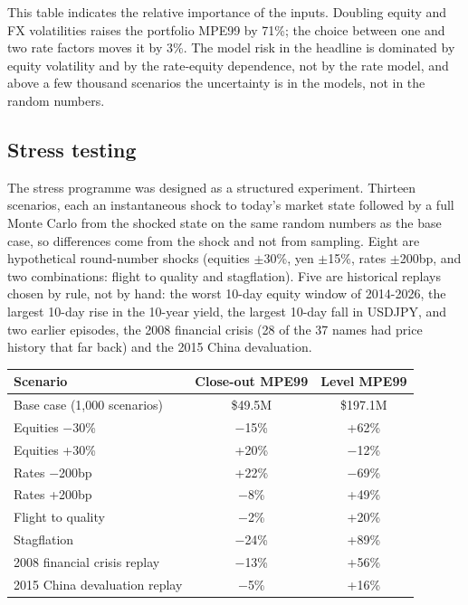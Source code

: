 \documentclass[11pt,letterpaper]{article}
\begin{document}
This table indicates the relative importance of the inputs. Doubling equity and FX volatilities raises the portfolio MPE99 by 71\%; the choice between one and two rate factors moves it by 3\%. The model risk in the headline is dominated by equity volatility and by the rate-equity dependence, not by the rate model, and above a few thousand scenarios the uncertainty is in the models, not in the random numbers.

\subsection{Stress testing}
The stress programme was designed as a structured experiment. Thirteen scenarios, each an instantaneous shock to today's market state followed by a full Monte Carlo from the shocked state on the same random numbers as the base case, so differences come from the shock and not from sampling. Eight are hypothetical round-number shocks (equities $\pm$30\%, yen $\pm$15\%, rates $\pm$200bp, and two combinations: flight to quality and stagflation). Five are historical replays chosen by rule, not by hand: the worst 10-day equity window of 2014-2026, the largest 10-day rise in the 10-year yield, the largest 10-day fall in USDJPY, and two earlier episodes, the 2008 financial crisis (28 of the 37 names had price history that far back) and the 2015 China devaluation.

\begin{center}
\small
\begin{tabular}{@{}lcc@{}}
\toprule
\textbf{Scenario} & \textbf{Close-out MPE99} & \textbf{Level MPE99}\\
\midrule
Base case (1,000 scenarios) & \$49.5M & \$197.1M\\
Equities $-$30\% & $-$15\% & +62\%\\
Equities +30\% & +20\% & $-$12\%\\
Rates $-$200bp & +22\% & $-$69\%\\
Rates +200bp & $-$8\% & +49\%\\
Flight to quality & $-$2\% & +20\%\\
Stagflation & $-$24\% & +89\%\\
2008 financial crisis replay & $-$13\% & +56\%\\
2015 China devaluation replay & $-$5\% & +16\%\\
\bottomrule
\end{tabular}
\end{center}
\end{document}
